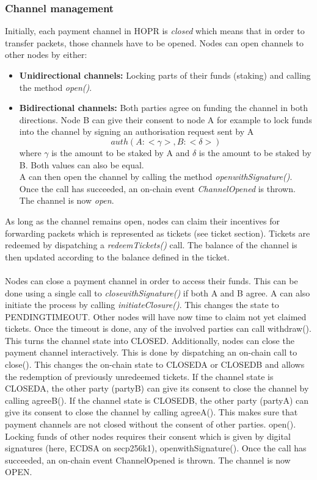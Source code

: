 \subsubsection{Channel management}
Initially, each payment channel in HOPR is \textit{closed} which means that in order to transfer packets, those channels have to be opened. Nodes can open channels to other nodes by either:
\begin{itemize}
    \item \textbf{Unidirectional channels:} Locking parts of their funds (staking) and calling the method \textit{open()}.
    \item \textbf{Bidirectional channels:} Both parties agree on funding the channel in both directions. Node B can give their consent to node A for example to lock funds into the channel by signing an authorisation request sent by A $$auth(A: <\gamma>, B: <\delta>)$$ where $\gamma$ is the amount to be staked by A and $\delta$ is the amount to be staked by B. Both values can also be equal. 
    \\ A can then open the channel by calling the method \textit{openwithSignature()}. Once the call has succeeded, an on-chain event \textit{ChannelOpened} is thrown. The channel is now \textit{open}.
\end{itemize} 
As long as the channel remains open, nodes can claim their incentives for forwarding packets which is represented as tickets (see ticket section). Tickets are redeemed by dispatching a \textit{redeemTickets()} call. The balance of the channel is then updated according to the balance defined in the ticket.
\\~\\Nodes can close a payment channel in order to access their funds. This can be done using a single call to \textit{closewithSignature()} if both A and B agree. A can also initiate the process by calling \textit{initiateClosure()}. This changes the state to PENDINGTIMEOUT. Other nodes will have now time to claim not yet claimed tickets. Once the timeout is done, any of the involved parties can call withdraw(). This turns the channel state into CLOSED. Additionally, nodes can close the payment channel interactively. This is done by dispatching an on-chain call to close(). This changes the on-chain state to CLOSEDA or CLOSEDB and allows the redemption of previously unredeemed tickets. If the channel state is CLOSEDA, the other party (partyB) can give its consent to close the channel by calling agreeB(). If the channel state is CLOSEDB, the other party (partyA) can give its consent to close the channel by calling agreeA(). This makes sure that payment channels are not closed without the consent of other parties.
open(). Locking funds of other nodes requires their consent which is given by digital signatures (here, ECDSA on secp256k1), openwithSignature(). Once the call has succeeded, an on-chain event ChannelOpened is thrown. The channel is now OPEN.


